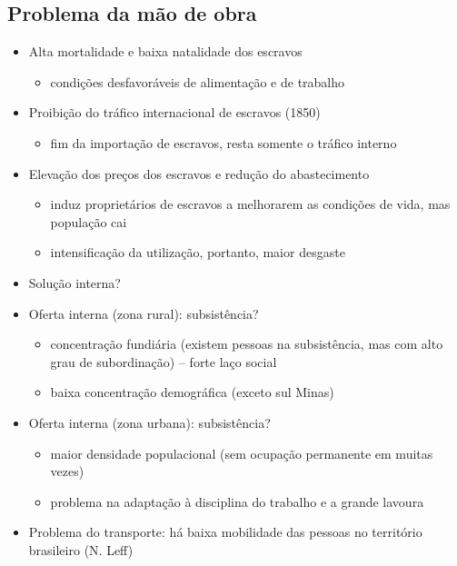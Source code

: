 \documentclass[a4paper,12pt]{article}[abntex2]
\begin{document}
\subsection{\textbf{Problema da mão de obra}}
\begin{itemize}
    \item Alta mortalidade e baixa natalidade dos escravos
    \begin{itemize}
        \item condições desfavoráveis de alimentação e de trabalho
    \end{itemize}
    \item Proibição do tráfico internacional de escravos (1850)
    \begin{itemize}
        \item fim da importação de escravos, resta somente o tráfico interno
    \end{itemize} 
\item Elevação dos preços dos escravos e redução do abastecimento
\begin{itemize}
    \item induz proprietários de escravos a melhorarem as condições de vida, mas população cai
\end{itemize}
\begin{itemize}
    \item intensificação da utilização, portanto, maior desgaste
\end{itemize}
\item Solução interna?
\item Oferta interna (zona rural): subsistência?
\begin{itemize}
    \item concentração fundiária (existem pessoas na subsistência, mas com alto grau de subordinação) – forte laço social
\end{itemize} 
\begin{itemize}
    \item baixa concentração demográfica (exceto sul Minas)
\end{itemize}
\item Oferta interna (zona urbana): subsistência?
\begin{itemize}
    \item maior densidade populacional (sem ocupação permanente em muitas vezes)
\end{itemize} 
\begin{itemize}
    \item problema na adaptação à disciplina do trabalho e a grande lavoura
\end{itemize}
\item Problema do transporte: há baixa mobilidade das pessoas no território brasileiro (N. Leff)


\end{itemize}
\end{document}

